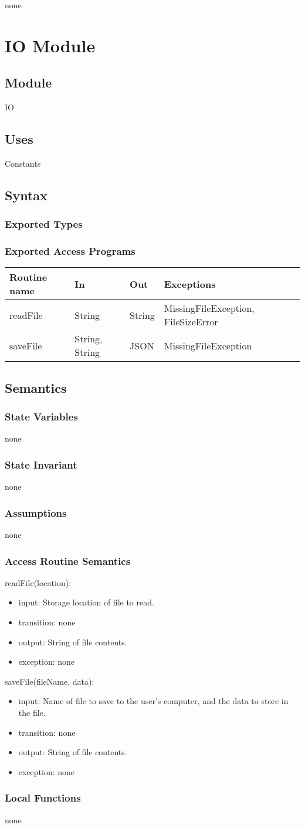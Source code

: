 \documentclass[12pt, titlepage]{article}
\newcommand{\newModule}[9]{
	\subsection* {Module}
		#1
	\subsection* {Uses}
		#2
	\subsection* {Syntax}
		\subsubsection* {Exported Types}
			#3
		\subsubsection* {Exported Access Programs}
			#4
	\subsection* {Semantics}
		\subsubsection* {State Variables}
			#5
		\subsubsection* {State Invariant}
			#6
		\subsubsection* {Assumptions}
			#7
		\subsubsection* {Access Routine Semantics}
			#8
		\subsubsection* {Local Functions}
			#9
}
\newcommand{\newAccessProgram}[5]{
	\noindent #1:
		\begin{itemize}
		    \item input: #2
			\item transition: #3
			\item output: #4
			\item exception: #5
		\end{itemize}
}
\newcommand{\row}[4]{#1 & #2 & #3 & #4 ~\\ \hline}
\newcommand{\accessProgramsTableStart}{
\begin{tabular}{| l | l | l | l |}
\hline
\textbf{Routine name} & \textbf{In} & \textbf{Out} & \textbf{Exceptions}\\
\hline
}
\newcommand{\accessProgramsTableEnd}{
	\end{tabular}
}
\begin{document}
	{%
		none
	}
	
\newpage


\section {IO Module}

\label{IO}

\newModule{IO}
	{%
		Constants
	}
	{%
	}
	{%
		\accessProgramsTableStart
			\row{readFile}{String}{String}{MissingFileException, FileSizeError}
			\row{saveFile}{String, String}{JSON}{MissingFileException}
		\accessProgramsTableEnd
	}
	{%
		none
	}
	{%
        none
	}
	{%
		none
	}
	{%
		\newAccessProgram{readFile(location)}
			{%
				Storage location of file to read.
			}
			{%
				none
			}
			{%
				String of file contents.
			}
			{%
				none
			}
		\newAccessProgram{saveFile(fileName, data)}
			{%
				Name of file to save to the user's computer, and the data to store in the file.
			}
			{%
				none
			}
			{%
				String of file contents.
			}
			{%
				none
			}
	}
	{%
		none
	}
	
\newpage

\end{document}
